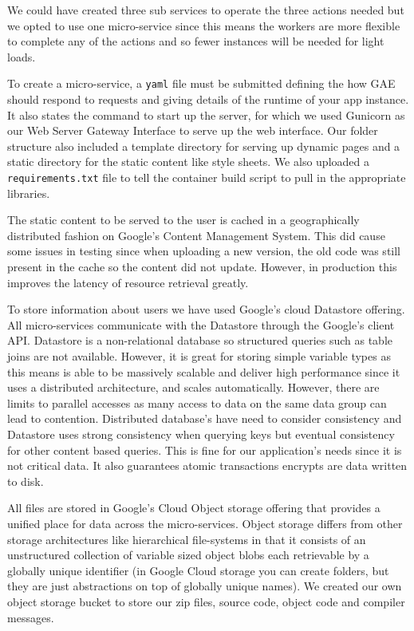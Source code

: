 \documentclass[conference]{IEEEtran}
\begin{document}
We could have created three
sub services to operate the three actions needed but we opted to use one
micro-service since this means the workers are more flexible to complete any of
the actions and so fewer instances will be needed for light loads.

To create a micro-service, a \texttt{yaml} file must be submitted defining the
how GAE should respond to requests and giving details of the runtime of your
app instance. It also states the command to start up the server, for which we
used Gunicorn\cite{gunicorn} as our Web Server Gateway Interface to serve up
the web interface. Our folder structure also included a template directory for
serving up dynamic pages and a static directory for the static content like
style sheets. We also uploaded a \texttt{requirements.txt} file to tell the
container build script to pull in the appropriate libraries.

The static content to be served to the user is cached in a geographically
distributed fashion on Google's Content Management System. This did cause some
issues in testing since when uploading a new version, the old code was still
present in the cache so the content did not update. However, in production this
improves the latency of resource retrieval greatly.

To store information about users we have used Google's cloud
Datastore\cite{datastore} offering. All micro-services communicate with the
Datastore through the Google's client API. Datastore is a non-relational
database so structured queries such as table joins are not available. However,
it is great for storing simple variable types as this means is able to be
massively scalable and deliver high performance since it uses a distributed
architecture, and scales automatically. However, there are limits to parallel accesses as many access to data on the same data group can lead to contention. Distributed database's have need to
consider consistency and Datastore uses strong consistency when querying keys
but eventual consistency for other content based queries. This is fine for our
application's needs since it is not critical data. It also guarantees atomic
transactions encrypts are data written to disk.

All files are stored in Google's Cloud Object storage offering\cite{storage}
that provides a unified place for data across the micro-services. Object
storage differs from other storage architectures like hierarchical file-systems
in that it consists of an unstructured collection of variable sized object
blobs each retrievable by a globally unique identifier (in Google Cloud storage
you can create folders, but they are just abstractions on top of globally
unique names). We created our own object storage bucket to store our zip files,
source code, object code and compiler messages.
\end{document}
